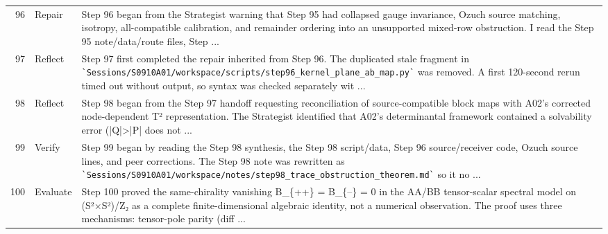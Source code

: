 \documentclass[UTF8,fontset=fandol,zihao=-4]{ctexart}
\begin{document}
\begin{longtable}{r p{} >{\raggedright\arraybackslash}p{}}
96 & Repair & Step 96 began from the Strategist warning that Step 95 had collapsed gauge invariance, Ozuch source matching, isotropy, all-compatible calibration, and remainder ordering into an unsupported mixed-row obstruction. I read the Step 95 note/data/route files, Step ...\\
97 & Reflect & Step 97 first completed the repair inherited from Step 96. The duplicated stale fragment in \nolinkurl{`Sessions/S0910A01/workspace/scripts/step96_kernel_plane_ab_map.py`} was removed. A first 120-second rerun timed out without output, so syntax was checked separately wit ...\\
98 & Reflect & Step 98 began from the Step 97 handoff requesting reconciliation of source-compatible block maps with A02's corrected node-dependent T² representation. The Strategist identified that A02's determinantal framework contained a solvability error (|Q|>|P| does not ...\\
99 & Verify & Step 99 began by reading the Step 98 synthesis, the Step 98 script/data, Step 96 source/receiver code, Ozuch source lines, and peer corrections. The Step 98 note was rewritten as \nolinkurl{`Sessions/S0910A01/workspace/notes/step98_trace_obstruction_theorem.md`} so it no  ...\\
100 & Evaluate & Step 100 proved the same-chirality vanishing B\_\{++\} = B\_\{--\} = 0 in the AA/BB tensor-scalar spectral model on (S²×S²)/Z₂ as a complete finite-dimensional algebraic identity, not a numerical observation. The proof uses three mechanisms: tensor-pole parity (diff ...\\
\bottomrule\end{longtable}
\normalfont\normalsize
\end{document}
